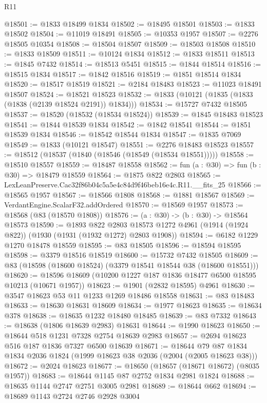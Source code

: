 \begin{lexlean}{R11}
\begin{coremodule}
@18501 := @1833 @18499 @1834
@18502 := @18495 @18501
@18503 := @1833 @18502
@18504 := @11019 @18491
@18505 := @10353 @1957
@18507 := @2276 @18505 @10354
@18508 := @18504 @18507
@18509 := @18503 @18508
@18510 := @1833 @18509
@18511 := @10124 @1834
@18512 := @1833 @18511
@18513 := @1845 @7432
@18514 := @18513 @5451
@18515 := @1844 @18514
@18516 := @18515 @1834
@18517 := @1842 @18516
@18519 := @1851 @18514 @1834
@18520 := @18517 @18519
@18521 := @2184 @18483
@18523 := @11023 @18491 @18507
@18524 := @18521 @18523
@18532 := @1833 (@10121 (@1835 (@1833 (@1838 (@2139 @18524 @2191)) @1834)))
@18534 := @15727 @7432 @18505
@18537 := @18520 (@18532 (@18534 @18524))
@18539 := @1845 @18483 @18523
@18541 := @1844 @18539 @1834
@18542 := @1842 @18541
@18544 := @1851 @18539 @1834
@18546 := @18542 @18544 @1834
@18547 := @1835 @7069
@18549 := @1833 (@10121 @18547)
@18551 := @2276 @18483 @18523
@18557 := @18512 (@18537 (@1840 (@18546 (@18549 (@18534 @18551)))))
@18558 := @18510 @18557
@18559 := @18487 @18558
@18562 := fun (a : @30) => fun (b : @30) => @18479 @18559
@18564 := @1875 @822 @2803
@18565 := LexLeanPreserve.Cac32f86b04c5a5e4c84d9f46beb16e4c.R11.__fits_25
@18566 := @18565 @1957
@18567 := @18566 @1808
@18568 := @1881 @18567
@18569 := VerdantEngine.ScalarF32.addOrdered
@18570 := @18569 @1957
@18573 := @18568 (@83 (@18570 @1808))
@18576 := (a : @30) -> (b : @30) -> @18564 @18573
@18590 := @1893
    @822
    @2803
    @18573
    @1272
    @4961
    (@1914 (@1924 @822))
    (@1930 (@1931 (@1932 @1272) @2803 @1908))
@18594 := @6182 @1229 @1270 @18478 @18559
@18595 := @83 @18505
@18596 := @18594 @18595
@18598 := @3379 @18516 @18519
@18600 := @15732 @7432 @18505
@18609 := @83 (@18598 (@18600 @18524) (@3379 @18541 @18544 @38 (@18600 @18551)))
@18620 := @18596 @18609 (@10200 @1227 @187 @1836 @18477 @6500 @18595 @10213 (@10671 @1957))
@18623 := @1901 (@2832 @18595) @4961
@18630 := @3547 @18623 @53 @11 @1233 @1269 @18486 @18558
@18631 := @83 @18483
@18633 := @18630 @18631 @18609
@18634 := @1977 @18623
@18635 := @18634 @378
@18638 := @18635 @1232 @18480 @18485
@18639 := @83 @7332
@18643 := @18638 (@1806 @18639 @2983) @18631
@18644 := @1990 @18623
@18650 := @18644 @518 @1231 @7328 @2754 @18639 @2983
@18657 := @2694 @18623 @516 @187 @1836 @7327 @6500 @18639
@18671 := @18644 @79 @87 @1834 @1834 @2036 @1824 (@1999 @18623 @38 @2036 (@2004 (@2005 @18623 @38)))
@18672 := @2024 @18623
@18677 := @18650 (@18657 (@18671 @18672) (@8035 @1957))
@18683 := @18644 @1145 @87 @2752 @1834 @2981 @1824
@18688 := @18635 @1144 @2747 @2751 @3005 @2981
@18689 := @18644 @662
@18694 := @18689 @1143 @2724 @2746 @2928 @3004

\end{coremodule}
\end{lexlean}
